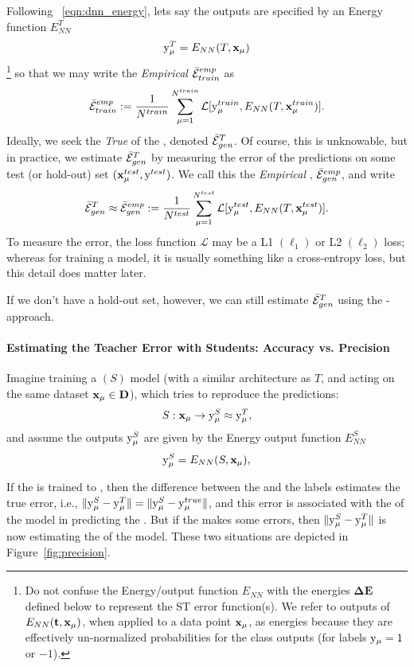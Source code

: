 Following \EQN~\ref{eqn:dnn_energy}, lets say the \Teacher outputs are specified
by an  Energy function $E^{T}_{NN}$
\begin{align}
\label{eqn:T_ENN}
\mathrm{y}_{\mu}^{T}=E_{NN}(T,\mathbf{x}_{\mu}) 
\end{align}
\footnote{Do not confuse the Energy/output function $E_{NN}$ with the energies $\mathbf{\Delta E}$  defined below to represent the ST error function(s).  We refer to outputs of $E_{NN}({\mathbf{t}},\mathbf{x}_{\mu} )$, when applied to a data point $\mathbf{x}_{\mu}$, as energies because they are effectively un-normalized probabilities for the class outputs (for labels $\mathrm{y}_{\mu}=1$ or $-1$).  }
so that we may write the \emph{Empirical} \AverageTrainingError
$\bar{\mathcal{E}}^{emp}_{train}$
as 
\begin{align}
\label{eqn:Eg_train}
\bar{\mathcal{E}}^{emp}_{train}:= \frac{1}{N^{train}}\sum_{\mu=1}^{N^{train}}\mathcal{L}[\mathrm{y}_{\mu}^{train},E_{NN}(T,\mathbf{x}_{\mu}^{train})]  .
\end{align}
Ideally, we seek the \emph{True} \AverageGeneralizationError of the \Teacher, denoted  $\bar{\mathcal{E}}_{gen}^{T}$. 
Of course, this is unknowable, but in practice, we estimate $\bar{\mathcal{E}}_{gen}^{T}$ 
by measuring the error of the \Teacher predictions on some test (or hold-out) set $(\mathbf{x}_{\mu}^{test}, \mathrm{y}^{test})$.
We call this the \emph{Empirical \AverageGeneralizationError}, $\bar{\mathcal{E}}^{emp}_{gen}$, and write
\begin{align}
\label{eqn:Eg_test}
 \bar{\mathcal{E}}_{gen}^{T}\approx \bar{\mathcal{E}}^{emp}_{gen}:= \frac{1}{N^{test}}\sum_{\mu=1}^{N^{test}}\mathcal{L}[\mathrm{y}_{\mu}^{test},E_{NN}(T,\mathbf{x}_{\mu}^{test})] .
\end{align}
To measure the error, the loss function $\mathcal{L}$ may be a L1 $(\ell_1)$ or L2 $(\ell_2)$ loss;
whereas for training a model, it is usually something like a cross-entropy loss, but this detail does matter later.

If we don't have a hold-out set, however, we can still estimate $\bar{\mathcal{E}}_{gen}^{T}$ using the \Student-\Teacher approach.

\paragraph{Estimating the Teacher Error with Students: Accuracy vs. Precision}

Imagine training a \Student $(S)$  model (with a similar architecture as $T$, and acting on the same  
dataset $\mathbf{x}_{\mu}\in\mathbf{D}$), which tries to  reproduce the \Teacher predictions:
\begin{align}
S:\mathbf{x}_{\mu}\rightarrow \mathrm{y}_{\mu}^{S} \approx \mathrm{y}_{\mu}^{T}  ,
\end{align}
and assume the \Student outputs $\mathrm{y}_{\mu}^{S}$ are given by the Energy output function $E^{S}_{NN}$
\begin{align}
\label{eqn:S_ENN}
\mathrm{y}_{\mu}^{S}=E_{NN}(S,\mathbf{x}_{\mu}) ,
\end{align}

If the \Teacher is trained to \Interpolation, then the difference between
the \Student and the \Teacher labels 
estimates the true error, i.e., $\Vert\mathrm{y}_{\mu}^{S}-\mathrm{y}_{\mu}^{T}\Vert=\Vert\mathrm{y}_{\mu}^{S}-\mathrm{y}_{\mu}^{true}\Vert$,
and this error is associated with the \TrainingAccuracy of the model in predicting the \GroundTruth.
But if the \Teacher makes some errors, then $\Vert\mathrm{y}_{\mu}^{S}-\mathrm{y}_{\mu}^{T}\Vert$
is now estimating the \Precision of the model.
These two situations are depicted in Figure~\ref{fig:precision}.


